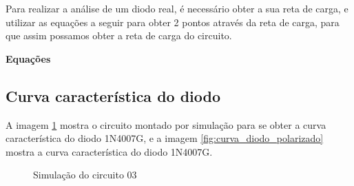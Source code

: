 Para realizar a análise de um diodo real, é necessário obter a sua reta de carga, e utilizar as equações a seguir para obter 2 pontos através da reta de carga, para que assim possamos obter a reta de carga do circuito.

\noindent
\textbf{Equações}

\begin{Resolucao}[H]
    \label{res:Circuito02}
\end{Resolucao}

\subsection{Curva característica do diodo}

A imagem \ref{fig:Circuito04} mostra o circuito montado por simulação para se obter a curva característica do diodo 1N4007G, e a imagem \ref{fig:curva_diodo_polarizado} mostra a curva característica do diodo 1N4007G.

\begin{figure}[H]
    \centering
    \caption{Simulação do circuito 03}
    \vspace{-0.3cm}
    \label{fig:Circuito04}
\end{figure}

